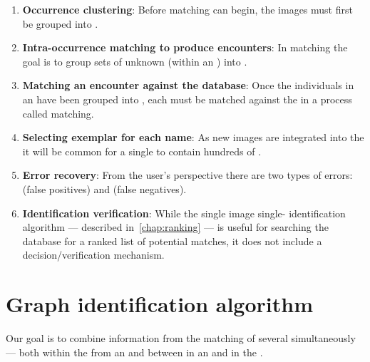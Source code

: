     \begin{enumerate}
        \item \textbf{Occurrence clustering}:
            Before \intraoccurrence{} matching can begin, the images must first be grouped into \occurrences{}.
            
        \item \textbf{Intra-occurrence matching to produce encounters}:
            In \intraoccurrence{} matching the goal is to group sets of
              unknown \annots{} (within an \occurrence{}) into \encounters{}.

        \item \textbf{Matching an encounter against the database}:
            Once the individuals in an \occurrence{} have been grouped into
              \encounters{}, each \encounter{} must be matched against the
              \masterdatabase{} in a process called \vsexemplar{} matching.
            
        \item \textbf{Selecting exemplar \annots{} for each name}:
            As new images are integrated into the \masterdatabase{} it will be
              common for a single \name{} to contain hundreds of \annots{}.
            
        \item \textbf{Error recovery}:
            From the user's perspective there are two types of errors:
             (false positives) and  (false negatives).
            
        \item \textbf{Identification verification}:
            While the single image single-\annot{} identification algorithm
              --- described in~\cref{chap:ranking} --- is useful for searching
              the database for a ranked list of potential matches, it does not
              include a decision/verification mechanism.
    \end{enumerate}
    
\section{Graph identification algorithm}
    Our goal is to combine information from the matching of several \annots{} simultaneously --- both within the
      \annots{} from an \occurrence{} and between \annots{} in an \occurrence{} and \annots{} in the \masterdatabase{}.
    
